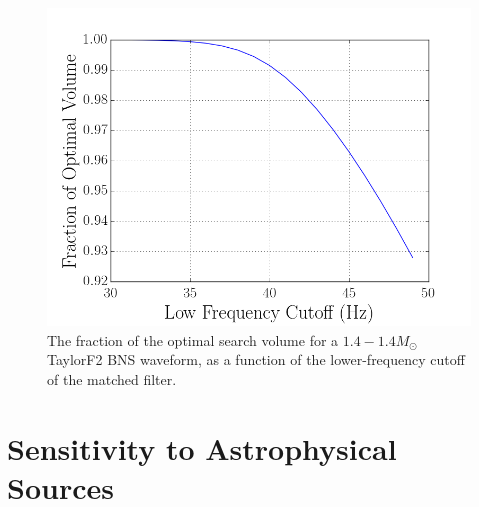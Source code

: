 


\begin{figure}
\centering
\includegraphics[width=1.0\textwidth]{papers/bns_o1_dev/figures/flow.png}
\caption{\label{fig:flow} 
The fraction of the optimal search volume for a $1.4-1.4 M_\odot$ TaylorF2 BNS waveform, as a function of the lower-frequency cutoff of the matched filter. 
}
\end{figure}

\section{Sensitivity to Astrophysical Sources}

